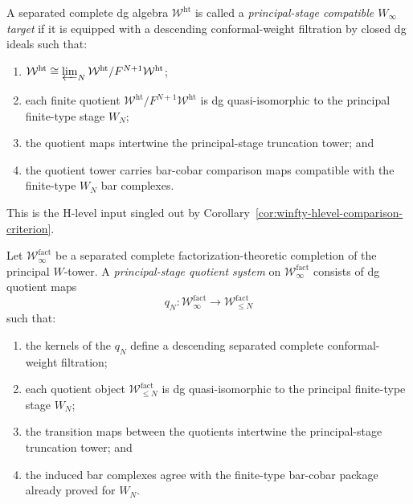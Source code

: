 \begin{definition}
\label{def:winfty-principal-stage-compatible}
A separated complete dg algebra $\mathcal{W}^{\mathrm{ht}}$ is called a
\emph{principal-stage compatible $W_\infty$ target} if it is equipped
with a descending conformal-weight filtration by closed dg ideals such
that:
\begin{enumerate}
\item $\mathcal{W}^{\mathrm{ht}} \cong
 \varprojlim_N \mathcal{W}^{\mathrm{ht}}/F^{N+1}\mathcal{W}^{\mathrm{ht}}$;
\item each finite quotient
 $\mathcal{W}^{\mathrm{ht}}/F^{N+1}\mathcal{W}^{\mathrm{ht}}$ is dg
 quasi-isomorphic to the principal finite-type stage $W_N$;
\item the quotient maps intertwine the principal-stage truncation tower;
 and
\item the quotient tower carries bar-cobar comparison maps compatible
 with the finite-type $W_N$ bar complexes.
\end{enumerate}
This is the H-level input singled out by
Corollary~\ref{cor:winfty-hlevel-comparison-criterion}.
\end{definition}

\begin{definition}
\label{def:winfty-quotient-system}
Let $\mathcal{W}^{\mathrm{fact}}_\infty$ be a separated complete
factorization-theoretic completion of the principal $W$-tower. A
\emph{principal-stage quotient system} on
$\mathcal{W}^{\mathrm{fact}}_\infty$ consists of dg quotient maps
\[
q_N\colon \mathcal{W}^{\mathrm{fact}}_\infty \longrightarrow
\mathcal{W}^{\mathrm{fact}}_{\le N}
\]
such that:
\begin{enumerate}
\item the kernels of the $q_N$ define a descending separated complete
 conformal-weight filtration;
\item each quotient object
 $\mathcal{W}^{\mathrm{fact}}_{\le N}$ is dg quasi-isomorphic to the
 principal finite-type stage $W_N$;
\item the transition maps between the quotients intertwine the
 principal-stage truncation tower; and
\item the induced bar complexes agree with the finite-type bar-cobar
 package already proved for $W_N$.
\end{enumerate}
\end{definition}

